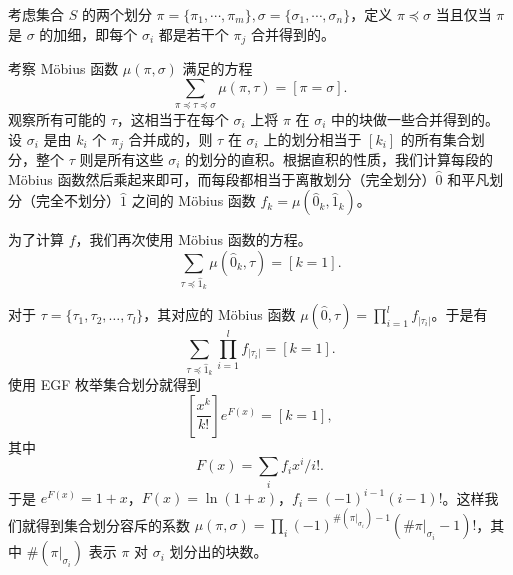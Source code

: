\begin{example}[集合划分容斥]
    考虑集合 $S$ 的两个划分 $\pi=\{\pi_1,\cdots,\pi_m\},\sigma=\{\sigma_1,\cdots,\sigma_n\}$，定义 $\pi\preceq \sigma$ 当且仅当 $\pi$ 是 $\sigma$ 的加细，即每个 $\sigma_i$ 都是若干个 $\pi_j$ 合并得到的。

    考察 M{\"o}bius 函数 $\mu(\pi,\sigma)$ 满足的方程
    $$
    \sum_{\pi\preceq \tau\preceq \sigma}\mu(\pi,\tau)=[\pi=\sigma].
    $$
    观察所有可能的 $\tau$，这相当于在每个 $\sigma_i$ 上将 $\pi$ 在 $\sigma_i$ 中的块做一些合并得到的。设 $\sigma_i$ 是由 $k_i$ 个 $\pi_j$ 合并成的，则 $\tau$ 在 $\sigma_i$ 上的划分相当于 $[k_i]$ 的所有集合划分，整个 $\tau$ 则是所有这些 $\sigma_i$ 的划分的直积。根据直积的性质，我们计算每段的 M{\"o}bius 函数然后乘起来即可，而每段都相当于离散划分（完全划分）$\hat 0$ 和平凡划分（完全不划分）$\hat 1$ 之间的 M{\"o}bius 函数 $f_k=\mu(\hat 0_k,\hat 1_k)$。
    
    为了计算 $f$，我们再次使用 M{\"o}bius 函数的方程。
    $$
    \sum_{\tau\preceq \hat 1_k}\mu(\hat 0_k,\tau)=[k=1].
    $$    
    
    对于 $\tau=\{\tau_1,\tau_2,\ldots,\tau_l\}$，其对应的 M{\"o}bius 函数 $\mu(\hat 0,\tau)=\prod_{i=1}^l f_{|\tau_i|}$。于是有
    $$
    \sum_{\tau\preceq \hat 1_k}\prod_{i=1}^l f_{|\tau_i|}=[k=1].
    $$
    使用 EGF 枚举集合划分就得到
    $$
    \left[\frac{x^k}{k!}\right]e^{F(x)}=[k=1],
    $$
    其中
    $$
    F(x)=\sum_i f_ix^i/i!.
    $$
    于是 $e^{F(x)}=1+x$，$F(x)=\ln(1+x)$，$f_i=(-1)^{i-1}(i-1)!$。这样我们就得到集合划分容斥的系数 $\mu(\pi,\sigma)=\prod_{i}(-1)^{\#(\pi|_{\sigma_i})-1}(\#\pi|_{\sigma_i}-1)!$，其中 $\#(\pi|_{\sigma_i})$ 表示 $\pi$ 对 $\sigma_i$ 划分出的块数。
\end{example}
